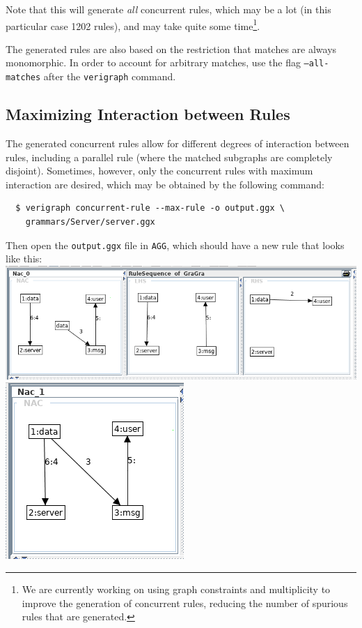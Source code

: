 \documentclass[12pt]{article}
\newenvironment{tutorialstep}
	{\hspace{-\parindent}\begin{minipage}{\textwidth}}
    {\vspace{.3cm}\end{minipage}}
\begin{document}
Note that this will generate \emph{all} concurrent rules, which may be a lot (in this particular case 1202 rules), and may take quite some time\footnote{We are currently working on using graph constraints and multiplicity to improve the generation of concurrent rules, reducing the number of spurious rules that are generated.}.

The generated rules are also based on the restriction that matches are always monomorphic. In order to account for arbitrary matches, use the flag \texttt{--all-matches} after the \texttt{verigraph} command.

\subsection{Maximizing Interaction between Rules}

The generated concurrent rules allow for different degrees of interaction between rules, including a parallel rule (where the matched subgraphs are completely disjoint). Sometimes, however, only the concurrent rules with maximum interaction are desired, which may be obtained by the following command:

\begin{verbatim}
  $ verigraph concurrent-rule --max-rule -o output.ggx \
    grammars/Server/server.ggx
\end{verbatim}

\begin{tutorialstep}
  Then open the \texttt{output.ggx} file in \texttt{AGG}, which should have a new rule that looks like this:\\

  \noindent
  \includegraphics[scale = 0.5]{rule-sequence_04a.png}\\
  \noindent
  \includegraphics[scale = 0.5]{rule-sequence_04b.png}\\
\end{tutorialstep}
\end{document}
